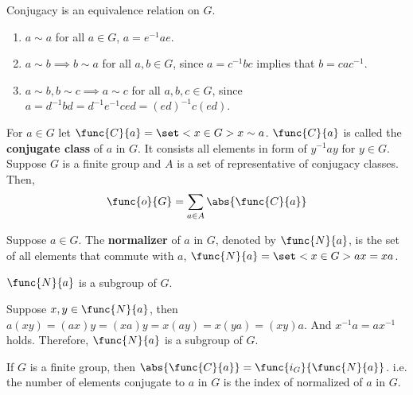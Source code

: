\begin{lemma}
    Conjugacy is an equivalence relation on \(G\).
\end{lemma}

\begin{prooflemma}
    \begin{enumerate}
        \item \(a \sim a\) for all \(a \in G\), \(a = e^{-1}ae\).
        \item \(a \sim b \implies b \sim a\) for all \(a,b \in G\), since \(a = c^{-1}bc \) implies that \(b = cac^{-1}\).
        \item \(a \sim b, b \sim c \implies a \sim c\) for all \(a,b,c \in G\), since \(a = d^{-1}b d = d^{-1}e^{-1}ced = (ed)^{-1}c(ed)\).
    \end{enumerate}
\end{prooflemma}

For \(a\in G\) let \(\func{C}{a} = \set<x \in G>{x \sim a}\). \(\func{C}{a}\) is called the \textbf{conjugate class} of \(a \) in \(G\). It consists all elements in form of \(y^{-1}ay\) for \(y \in G\). Suppose \(G\) is a finite group and \(A\) is a set of representative of conjugacy classes. Then, 
\begin{equation*}
    \func{o}{G} = \sum_{a \in A} \abs{\func{C}{a}}
\end{equation*}

\begin{definition}
    Suppose \(a \in G\). The \textbf{normalizer} of \(a\) in \(G\), denoted by \(\func{N}{a}\), is the set of all elements that commute with \(a\), \(\func{N}{a} = \set<x \in G>{ax = xa}\).
\end{definition}

\begin{lemma}
    \(\func{N}{a}\) is a subgroup of \(G\).
\end{lemma}

\begin{prooflemma}
    Suppose \(x,y \in \func{N}{a}\), then \(a(xy) = (ax)y = (xa)y = x(ay) = x(ya) = (xy)a\). And \(x^{-1}a = ax^{-1}\) holds. Therefore, \(\func{N}{a}\) is a subgroup of \(G\).
\end{prooflemma}

\begin{theorem}\label{thm:SizeofConjugacyClass}
    If \(G\) is a finite group, then \(\abs{\func{C}{a}} = \func{i_G}{\func{N}{a}}\). i.e. the number of elements conjugate to \(a\) in \(G\) is the index of normalized of \(a\) in \(G\).
\end{theorem}

